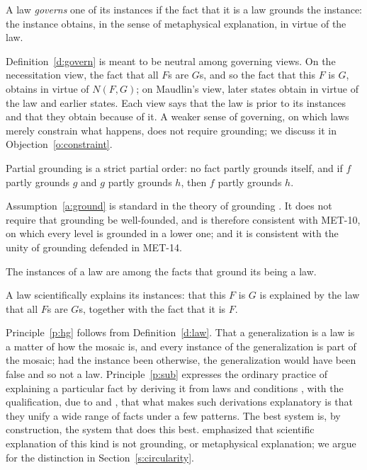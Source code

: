 \documentclass{situationist-preprint}
\begin{document}
\begin{definition}[Governing]\label{d:govern}
A law \emph{governs} one of its instances if the fact that it is a law grounds the instance: the instance obtains, in the sense of metaphysical explanation, in virtue of the law.
\end{definition}

Definition~\ref{d:govern} is meant to be neutral among governing views. On the necessitation view, the fact that all $F$s are $G$s, and so the fact that this $F$ is $G$, obtains in virtue of $N(F, G)$; on Maudlin's view, later states obtain in virtue of the law and earlier states. Each view says that the law is prior to its instances and that they obtain because of it. A weaker sense of governing, on which laws merely constrain what happens, does not require grounding; we discuss it in Objection~\ref{o:constraint}.

\begin{assumption}[Grounding]\label{a:ground}
Partial grounding is a strict partial order: no fact partly grounds itself, and if $f$ partly grounds $g$ and $g$ partly grounds $h$, then $f$ partly grounds $h$.
\end{assumption}

Assumption~\ref{a:ground} is standard in the theory of grounding \citep{Fine2012,Rosen2010,Schaffer2009}. It does not require that grounding be well-founded, and is therefore consistent with MET-10, on which every level is grounded in a lower one; and it is consistent with the unity of grounding defended in MET-14.

\begin{principle}\label{p:hg}
The instances of a law are among the facts that ground its being a law.
\end{principle}

\begin{principle}\label{p:sub}
A law scientifically explains its instances: that this $F$ is $G$ is explained by the law that all $F$s are $G$s, together with the fact that it is $F$.
\end{principle}

Principle~\ref{p:hg} follows from Definition~\ref{d:law}. That a generalization is a law is a matter of how the mosaic is, and every instance of the generalization is part of the mosaic; had the instance been otherwise, the generalization would have been false and so not a law. Principle~\ref{p:sub} expresses the ordinary practice of explaining a particular fact by deriving it from laws and conditions \citep{HempelOppenheim1948}, with the qualification, due to \citet{Friedman1974} and \citet{Kitcher1981}, that what makes such derivations explanatory is that they unify a wide range of facts under a few patterns. The best system is, by construction, the system that does this best. \citet{Loewer2012} emphasized that scientific explanation of this kind is not grounding, or metaphysical explanation; we argue for the distinction in Section~\ref{s:circularity}.
\end{document}
